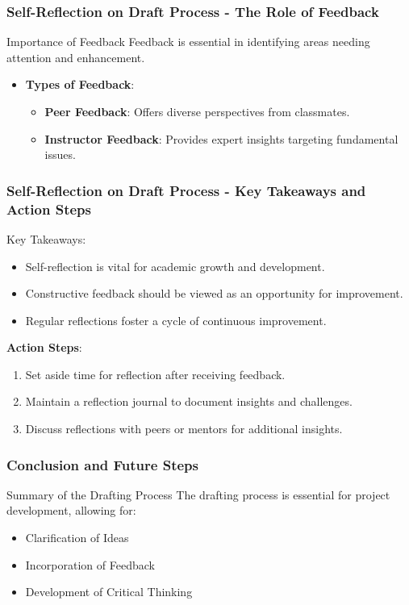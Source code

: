 \documentclass[aspectratio=169]{beamer}
\begin{document}
\begin{frame}[fragile]
    \frametitle{Self-Reflection on Draft Process - The Role of Feedback}
    \begin{block}{Importance of Feedback}
        Feedback is essential in identifying areas needing attention and enhancement.
    \end{block}
    \begin{itemize}
        \item \textbf{Types of Feedback}:
        \begin{itemize}
            \item \textbf{Peer Feedback}: Offers diverse perspectives from classmates.
            \item \textbf{Instructor Feedback}: Provides expert insights targeting fundamental issues.
        \end{itemize}
    \end{itemize}
\end{frame}

\begin{frame}[fragile]
    \frametitle{Self-Reflection on Draft Process - Key Takeaways and Action Steps}
    Key Takeaways:
    \begin{itemize}
        \item Self-reflection is vital for academic growth and development.
        \item Constructive feedback should be viewed as an opportunity for improvement.
        \item Regular reflections foster a cycle of continuous improvement.
    \end{itemize}
    
    \textbf{Action Steps}:
    \begin{enumerate}
        \item Set aside time for reflection after receiving feedback.
        \item Maintain a reflection journal to document insights and challenges.
        \item Discuss reflections with peers or mentors for additional insights.
    \end{enumerate}
\end{frame}

\begin{frame}[fragile]
    \frametitle{Conclusion and Future Steps}
    \begin{block}{Summary of the Drafting Process}
        The drafting process is essential for project development, allowing for:
        \begin{itemize}
            \item Clarification of Ideas
            \item Incorporation of Feedback
            \item Development of Critical Thinking
        \end{itemize}
    \end{block}
\end{frame}
\end{document}
